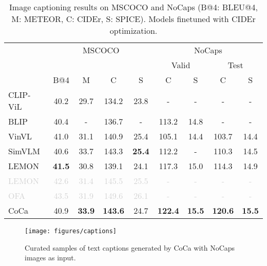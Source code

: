 \begin{table}[t]
\centering
\vspace{-1em}
\begin{tabular}{@{}lcccccccc@{}}
    \toprule 
    & \multicolumn{4}{c}{MSCOCO} & \multicolumn{4}{c}{NoCaps} \\
    \cmidrule(lr){2-5} \cmidrule(lr){6-9}
    &  &  &  &  & \multicolumn{2}{c}{Valid} & \multicolumn{2}{c}{Test} \\
    & B@4 & M & C & S & C & S & C & S \\
    \midrule
    CLIP-ViL~\cite{shen2021much} & 40.2 & 29.7 & 134.2 & 23.8 & - & - & - & - \\
    BLIP~\cite{li2022blip} & 40.4 & - & 136.7 & - & 113.2 & 14.8 & - & - \\
    VinVL\cite{Zhang_2021_CVPR} & 41.0 & 31.1 & 140.9 & 25.4 & 105.1 & 14.4 & 103.7 & 14.4 \\
    SimVLM~\cite{wang2021simvlm} & 40.6 & 33.7 & 143.3 & \bf 25.4 & 112.2 & - & 110.3 & 14.5 \\
    LEMON~\cite{hu2021scaling} & \bf 41.5 & 30.8 & 139.1 & 24.1 & 117.3 & 15.0 & 114.3 & 14.9 \\
    \textcolor{lightgray}{LEMON~\cite{hu2021scaling}} & \textcolor{lightgray}{42.6} & \textcolor{lightgray}{31.4} & \textcolor{lightgray}{145.5} & \textcolor{lightgray}{25.5} & \textcolor{lightgray}{-} & \textcolor{lightgray}{-} & \textcolor{lightgray}{-} & \textcolor{lightgray}{-}\\
    \textcolor{lightgray}{OFA~\cite{wang2022unifying}} & \textcolor{lightgray}{43.5} & \textcolor{lightgray}{31.9} & \textcolor{lightgray}{149.6} & \textcolor{lightgray}{26.1} & \textcolor{lightgray}{-} & \textcolor{lightgray}{-} & \textcolor{lightgray}{-} & \textcolor{lightgray}{-}\\
    \midrule
    CoCa & 40.9 & \bf 33.9 & \bf 143.6 & 24.7 & \bf 122.4 & \bf 15.5 & \bf 120.6 & \bf 15.5\\
    \bottomrule
\end{tabular}
\caption{\label{tabs:caption} Image captioning results on MSCOCO and NoCaps (B@4: BLEU@4, M: METEOR, C: CIDEr, S: SPICE). Models finetuned with CIDEr optimization. }
\end{table} \begin{figure}[h!]
\centering
\texttt{[image: figures/captions]}
\caption{Curated samples of text captions generated by CoCa with NoCaps images as input.}
\label{figs:caption}
\end{figure}


